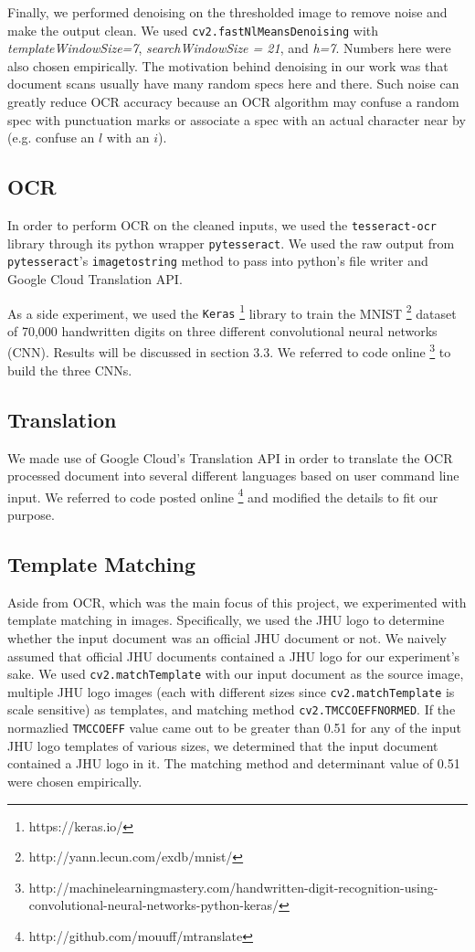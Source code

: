 \documentclass[11pt,letterpaper]{article}
\begin{document}
Finally, we performed denoising on the thresholded image to remove noise and make the output clean. We used {\tt cv2.fastNlMeansDenoising} with \textit{templateWindowSize=7}, \textit{searchWindowSize = 21}, and \textit{h=7}. Numbers here were also chosen empirically. The motivation behind denoising in our work was that document scans usually have many random specs here and there. Such noise can greatly reduce OCR accuracy because an OCR algorithm may confuse a random spec with punctuation marks or associate a spec with an actual character near by (e.g. confuse an $l$ with an $i$).

\subsection{OCR}

In order to perform OCR on the cleaned inputs, we used the {\tt tesseract-ocr} library through its python wrapper {\tt pytesseract}. We used the raw output from {\tt pytesseract}'s {\tt image\textunderscore to\textunderscore string} method to pass into python's file writer and Google Cloud Translation API.

As a side experiment, we used the {\tt Keras} \footnote{https://keras.io/} library to train the MNIST \footnote{http://yann.lecun.com/exdb/mnist/} dataset of 70,000 handwritten digits on three different convolutional neural networks (CNN). Results will be discussed in section 3.3. We referred to code online \footnote{http://machinelearningmastery.com/handwritten-digit-recognition-using-convolutional-neural-networks-python-keras/} to build the three CNNs.

\subsection{Translation}

We made use of Google Cloud's Translation API in order to translate the OCR processed document into several different languages based on user command line input. We referred to code posted online \footnote{http://github.com/mouuff/mtranslate} and modified the details to fit our purpose.

\subsection{Template Matching}

Aside from OCR, which was the main focus of this project, we experimented with template matching in images. Specifically, we used the JHU logo to determine whether the input document was an official JHU document or not. We naively assumed that official JHU documents contained a JHU logo for our experiment's sake. We used {\tt cv2.matchTemplate} with our input document as the source image, multiple JHU logo images (each with different sizes since {\tt cv2.matchTemplate} is scale sensitive) as templates, and matching method {\tt cv2.TM\textunderscore CCOEFF\textunderscore NORMED}. If the normazlied {\tt TM\textunderscore CCOEFF} value came out to be greater than 0.51 for any of the input JHU logo templates of various sizes, we determined that the input document contained a JHU logo in it. The matching method and determinant value of 0.51 were chosen empirically.
\end{document}
